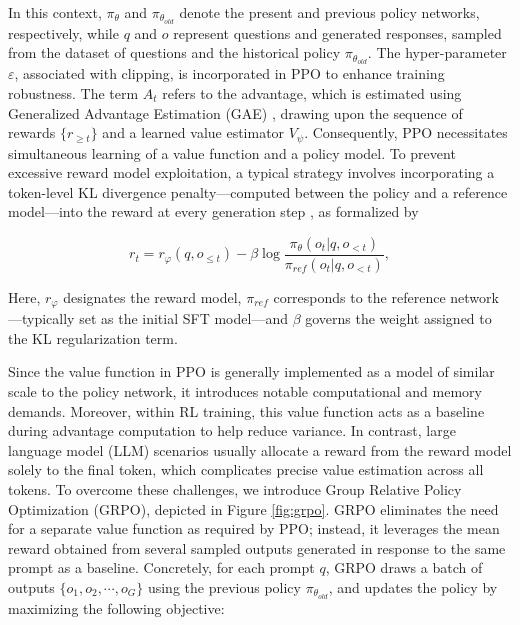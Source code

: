 \begin{itemize}[topsep=0pt]
In this context, $\pi_{\theta}$ and $\pi_{\theta_{old}}$ denote the present and previous policy networks, respectively, while $q$ and $o$ represent questions and generated responses, sampled from the dataset of questions and the historical policy $\pi_{\theta_{old}}$. The hyper-parameter $\varepsilon$, associated with clipping, is incorporated in PPO to enhance training robustness. The term $A_t$ refers to the advantage, which is estimated using Generalized Advantage Estimation (GAE) \citep{gae}, drawing upon the sequence of rewards $\{r_{\ge t}\}$ and a learned value estimator $V_{\psi}$. Consequently, PPO necessitates simultaneous learning of a value function and a policy model. To prevent excessive reward model exploitation, a typical strategy involves incorporating a token-level KL divergence penalty—computed between the policy and a reference model—into the reward at every generation step \citep{ouyang2022training}, as formalized by

\begin{equation}
    r_{t} = r_\varphi(q, o_{\le t}) - \beta \log\frac{\pi_{\theta}(o_{t}|q, o_{<t})}{\pi_{ref}(o_{t}|q, o_{<t})},
\label{eq:PPO-reward}
\end{equation}

Here, $r_\varphi$ designates the reward model, $\pi_{ref}$ corresponds to the reference network—typically set as the initial SFT model—and $\beta$ governs the weight assigned to the KL regularization term.

Since the value function in PPO is generally implemented as a model of similar scale to the policy network, it introduces notable computational and memory demands. Moreover, within RL training, this value function acts as a baseline during advantage computation to help reduce variance. In contrast, large language model (LLM) scenarios usually allocate a reward from the reward model solely to the final token, which complicates precise value estimation across all tokens. To overcome these challenges, we introduce Group Relative Policy Optimization (GRPO), depicted in Figure \ref{fig:grpo}. GRPO eliminates the need for a separate value function as required by PPO; instead, it leverages the mean reward obtained from several sampled outputs generated in response to the same prompt as a baseline. Concretely, for each prompt $q$, GRPO draws a batch of outputs $\{o_1, o_2, \cdots, o_G\}$ using the previous policy $\pi_{\theta_{old}}$, and updates the policy by maximizing the following objective:


\end{itemize}

